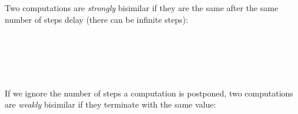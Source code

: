 Two computations are \emph{strongly} bisimilar if they are the
same after the same number of steps delay (there can be infinite
steps):

\begin{code}
\\
\>  \AgdaSymbol{\{} \AgdaSymbol{:} \AgdaSymbol{\}} \AgdaSymbol{:}        \<%
\\
\>[2]\<[4]%
\>[4] \<[11]%
\>[11]\AgdaSymbol{:}  \AgdaSymbol{\{}\AgdaSymbol{\}}  \AgdaSymbol{(} \AgdaSymbol{)}  \AgdaSymbol{(} \AgdaSymbol{)}\<%
\\
\>[2]\<[4]%
\>[4] \<[11]%
\>[11]\AgdaSymbol{:}  \AgdaSymbol{\{} \AgdaSymbol{\}} \AgdaSymbol{(} \AgdaSymbol{:}  \AgdaSymbol{((} \AgdaSymbol{)}  \AgdaSymbol{(} \AgdaSymbol{)))}  \AgdaSymbol{(} \AgdaSymbol{)}  \AgdaSymbol{(} \AgdaSymbol{)}\<%
\\
\end{code}

If we ignore the number of steps a computation is postponed, two computations are \emph{weakly} bisimilar if they terminate with the same value:

\begin{code}
\\
\>  \AgdaSymbol{\{} \AgdaSymbol{:} \AgdaSymbol{\}} \AgdaSymbol{:}        \<%
\\
\>[2]\<[4]%
\>[4] \<[11]%
\>[11]\AgdaSymbol{:}  \AgdaSymbol{\{}  \AgdaSymbol{\}}            \<%
\\
\>[2]\<[4]%
\>[4] \<[11]%
\>[11]\AgdaSymbol{:}  \AgdaSymbol{\{} \AgdaSymbol{\}} \AgdaSymbol{(} \AgdaSymbol{:}  \AgdaSymbol{((} \AgdaSymbol{)}  \AgdaSymbol{(} \AgdaSymbol{)))}  \AgdaSymbol{(} \AgdaSymbol{)}  \AgdaSymbol{(} \AgdaSymbol{)}\<%
\\
\end{code}


